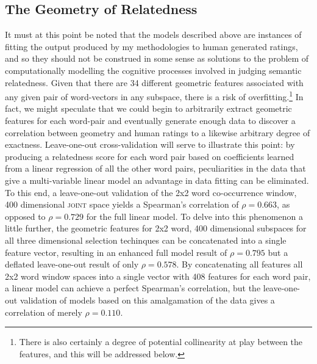 \subsection{The Geometry of Relatedness}
It must at this point be noted that the models described above are instances of fitting the output produced by my methodologies to human generated ratings, and so they should not be construed in some sense as solutions to the problem of computationally modelling the cognitive processes involved in judging semantic relatedness.  Given that there are 34 different geometric features associated with any given pair of word-vectors in any subspace, there is a risk of overfitting.\footnote{There is also certainly a degree of potential collinearity at play between the features, and this will be addressed below.}  In fact, we might speculate that we could begin to arbitrarily extract geometric features for each word-pair and eventually generate enough data to discover a correlation between geometry and human ratings to a likewise arbitrary degree of exactness.  Leave-one-out cross-validation will serve to illustrate this point: by producing a relatedness score for each word pair based on coefficients learned from a linear regression of all the other word pairs, peculiarities in the data that give a multi-variable linear model an advantage in data fitting can be eliminated.  To this end, a leave-one-out validation of the 2x2 word co-occurrence window, 400 dimensional \textsc{joint} space yields a Spearman's correlation of $\rho = 0.663$, as opposed to $\rho = 0.729$ for the full linear model.  To delve into this phenomenon a little further, the geometric features for 2x2 word, 400 dimensional subspaces for all three dimensional selection techinques can be concatenated into a single feature vector, resulting in an enhanced full model result of $\rho = 0.795$ but a deflated leave-one-out result of only $\rho = 0.578$.  By concatenating all features all 2x2 word window spaces into a single vector with 408 features for each word pair, a linear model can achieve a perfect Spearman's correlation, but the leave-one-out validation of models based on this amalgamation of the data gives a correlation of merely $\rho = 0.110$.


